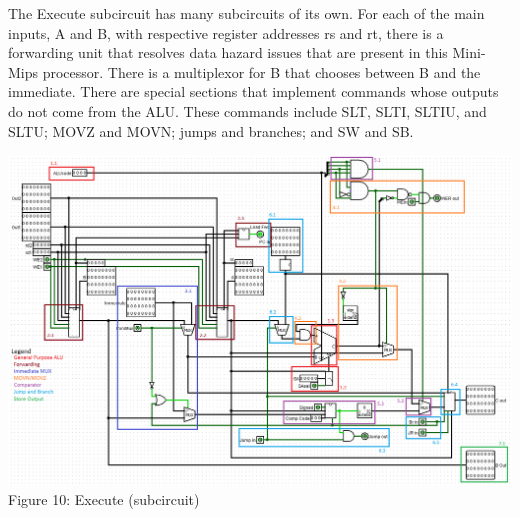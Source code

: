 \documentclass{article}
\begin{document}
The Execute subcircuit has many subcircuits of its own. For each of the main inputs, A and B, with respective register addresses rs and rt, there is a forwarding unit that resolves data hazard issues that are present in this Mini-Mips processor. There is a multiplexor for B that chooses between B and the immediate. There are special sections that implement commands whose outputs do not come from the ALU. These commands include SLT, SLTI, SLTIU, and SLTU; MOVZ and MOVN; jumps and branches; and SW and SB. 
\vspace{5mm}
\begin{center}
\includegraphics[width=15cm]{EXOVER.png} \\
Figure 10: Execute (subcircuit)
\end{center}
\end{document}
